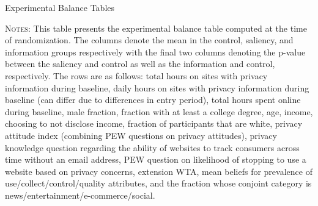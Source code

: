 \documentclass[12pt]{article}
\theoremstyle{definition}
\theoremstyle{remark}
\begin{document}
\begin{appendix}
\begin{table}[H]
\caption{Experimental Balance Tables}\label{tab:exp_balance_table}
\centering
\scalebox{0.8}{

}
\caption*{\scriptsize \textsc{Notes}: This table presents the experimental balance table computed at the time of randomization. The columns denote the mean in the control, saliency, and information groups respectively with the final two columns denoting the p-value between the saliency and control as well as the information and control, respectively. The rows are as follows: total hours on sites with privacy information during baseline, daily hours on sites with privacy information during baseline (can differ due to differences in entry period), total hours spent online during baseline, male fraction, fraction with at least a college degree, age, income, choosing to not disclose income, fraction of participants that are white, privacy attitude index (combining PEW questions on privacy attitudes), privacy knowledge question regarding the ability of websites to track consumers across time without an email address, PEW question on likelihood of stopping to use a website based on privacy concerns, extension WTA, mean beliefs for prevalence of use/collect/control/quality attributes, and the fraction whose conjoint category is news/entertainment/e-commerce/social.}
\end{table}



\end{appendix}
\end{document}
